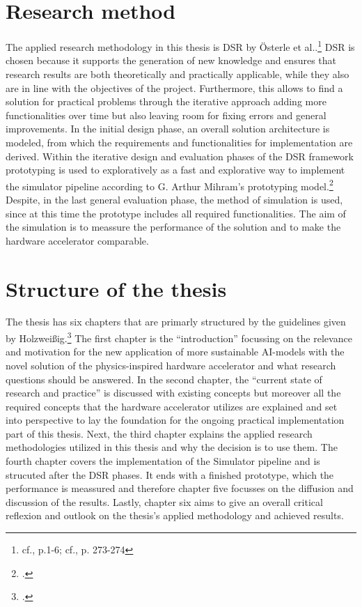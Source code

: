 \section{Research method}

The applied research methodology in this thesis is \ac{DSR} by Österle et al..\footnote{cf.\cite{oesterleMemorandumZurGestaltungsorientierten2010}, p.1-6; cf.\cite{oesterleKonsortialforschung2010}, p. 273-274}
\ac{DSR} is chosen because it supports the generation of new knowledge and ensures that research results are both theoretically and practically
applicable, while they also are in line with the objectives of the project.
Furthermore, this allows to find a solution for practical problems through the iterative approach adding more functionalities over time but also leaving room for fixing errors and general improvements.
In the initial design phase, an overall solution architecture is modeled, from which the requirements and functionalities for implementation are derived.
Within the iterative design and evaluation phases of the \ac{DSR} framework prototyping is used to exploratively as a fast and explorative way to implement the simulator pipeline according to G. Arthur Mihram's prototyping model.\footcite[cf.][71-72]{mihramSimulationMethodology1976}
Despite, in the last general evaluation phase, the method of simulation is used, since at this time the prototype includes all required functionalities.
The aim of the simulation is to meassure the performance of the solution and to make the hardware accelerator comparable. 

\section{Structure of the thesis}
The thesis has six chapters that are primarly structured by the guidelines given by Holzweißig.\footcite[cf.][32-40]{holzweissigWissenschaftlichesArbeiten2017}
The first chapter is the ``introduction'' focussing on the relevance and motivation for the new application of more sustainable AI-models
with the novel solution of the physics-inspired hardware accelerator and what research questions should be answered.
In the second chapter, the ``current state of research and practice'' is discussed with 
existing concepts but moreover all the required concepts that the hardware accelerator utilizes are explained 
and set into perspective to lay the foundation for the ongoing practical implementation part of this thesis.
Next, the third chapter explains the applied research methodologies utilized in this thesis and why the decision is to use them.
The fourth chapter covers the implementation of the Simulator pipeline and is strucuted after the \ac{DSR} phases.
It ends with a finished prototype, which the performance is meassured and therefore chapter five focusses on the 
diffusion and discussion of the results. 
Lastly, chapter six aims to give an overall critical reflexion and outlook on the thesis's applied methodology and achieved results.









